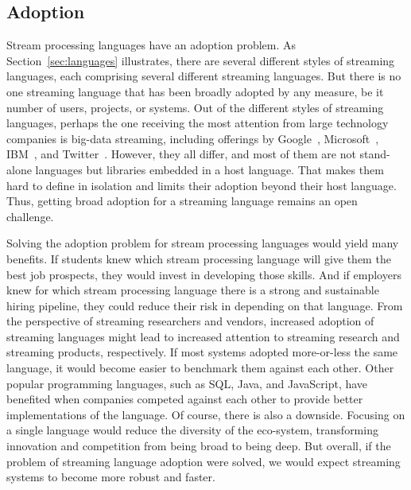 \subsection{Adoption}\label{sec:adoption} %

Stream processing languages have an adoption problem. As
Section~\ref{sec:languages} illustrates, there are several different
styles of streaming languages, each comprising several different
streaming languages. But there is no one streaming language that has
been broadly adopted by any measure, be it number of users, projects,
or systems. Out of the different styles of streaming languages,
perhaps the one receiving the most attention from large technology
companies is big-data streaming, including offerings by
Google~\cite{akidau_et_al_2013}, Microsoft~\cite{ali_et_al_2009},
IBM~\cite{hirzel_schneider_gedik_2017}, and
Twitter~\cite{toshniwal_et_al_2014}. However, they all differ, and
most of them are not stand-alone languages but libraries embedded in a
host language. That makes them hard to define in isolation and limits
their adoption beyond their host language. Thus, getting broad
adoption for a streaming language remains an open challenge.

Solving the adoption problem for stream processing languages would
yield many benefits. If students knew which stream processing language
will give them the best job prospects, they would invest in developing
those skills. And if employers knew for which stream processing
language there is a strong and sustainable hiring pipeline, they could
reduce their risk in depending on that language.  From the perspective
of streaming researchers and vendors, increased adoption of streaming
languages might lead to increased attention to streaming research and
streaming products, respectively. If most systems adopted more-or-less
the same language, it would become easier to benchmark them against
each other. Other popular programming languages, such as SQL, Java,
and JavaScript, have benefited when companies competed against each
other to provide better implementations of the language.  Of course,
there is also a downside. Focusing on a single language would reduce
the diversity of the eco-system, transforming innovation and
competition from being broad to being deep. But overall, if the
problem of streaming language adoption were solved, we would expect
streaming systems to become more robust and faster.

